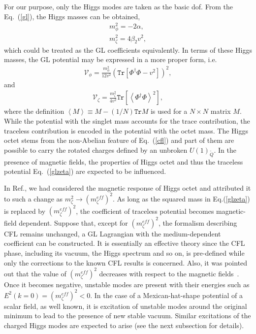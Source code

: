 \documentclass[prd, showpacs,nofootinbib,amsmath,amssymb]{revtex4}
\begin{document}
For our purpose, only the Higgs modes are taken as the basic dof. From the Eq.~(\ref{gl}), the Higgs
masses can be obtained,
\begin{eqnarray}
m_\phi^2=-2\alpha,\\ m_\zeta^2=4\beta_2
	v^2,\label{mhiggs}
\end{eqnarray}
which could be treated as the GL coefficients equivalently. In terms of these Higgs masses, the GL
potential may be expressed in a more proper form, i.e.
\begin{eqnarray}
\mathcal{V}_\phi=
\frac{m_\phi^2}{12v^2}(\texttt{Tr}[\Phi^\dagger\Phi-v^2])^2,
\label{glmphi}
\end{eqnarray}
and
\begin{eqnarray}
\mathcal{V}_\zeta=
\frac{m_\zeta^2}{4v^2}\texttt{Tr}\left[\left<\Phi^\dagger\Phi\right>^2\right],
\label{glzeta}
\end{eqnarray}
where the definition $\left<M\right>\equiv M-(1/N)\texttt{Tr}M$ is used for a $N\times N$ matrix $M$.
While the potential with the singlet mass accounts for the trace contribution, the traceless
contribution is encoded in the potential with the octet mass. The Higgs octet stems from the non-Abelian
feature of Eq.~(\ref{cfl}) and part of them are possible to carry the rotated charges defined by an
unbroken $U(1)_{\widetilde{Q}}$. In the presence of magnetic fields,
the properties of Higgs octet and thus the traceless potential Eq.~(\ref{glzeta}) are expected to
be influenced.

In Ref.\cite{zhang2015magnetic}, we had considered the magnetic response of Higgs octet  and attributed it to such a change as $m_\zeta^2 \rightarrow (m_\zeta^{eff})^2$.
As long as the squared mass in Eq.(\ref{glzeta}) is replaced by $(m_\zeta^{eff})^2$, the coefficient of traceless potential becomes magnetic-field dependent. Suppose that, except for $(m_\zeta^{eff})^2$, the formalism describing CFL remains unchanged, a GL Lagrangian with the medium-dependent coefficient can be constructed. 
It is essentially an effective theory since the CFL phase, including its vacuum, the Higgs spectrum and so on, is pre-defined while only the corrections to the known CFL results is concerned. 
Also, it was pointed out that the value of $(m_\zeta^{eff})^2$ decreases with respect to the magnetic fields~\cite{zhang2015magnetic}. Once it becomes negative, unstable modes are present with their energies such as $E^2(k=0)=(m_\zeta^{eff})^2<0$.
In the case of a Mexican-hat-shape potential of a scalar field, as well known, it is excitation of unstable modes around the original minimum to lead to the presence of new stable vacuum.  
Similar excitations of the charged Higgs modes are expected to arise (see the next subsection for details).
\end{document}
